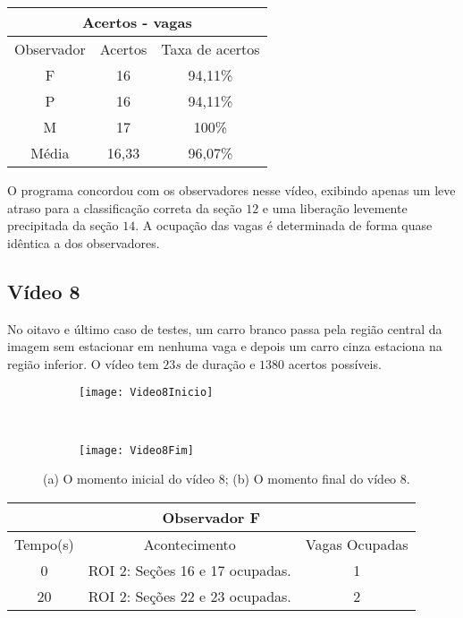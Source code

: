 \begin{center}
\begin{tabular}{|c||c||c|}
\hline
\multicolumn{3}{|c|}{Acertos - vagas}  \\ \hline \hline
Observador & Acertos & Taxa de acertos \\ \hline
F & 16 & 94,11\% \\  \hline
P & 16 & 94,11\% \\ \hline
M & 17 & 100\% \\ \hline
Média & 16,33 & 96,07\% \\
\hline
\end{tabular}
\end{center}

O programa concordou com os observadores nesse vídeo, exibindo apenas um leve atraso para a classificação correta da seção $12$ e uma liberação levemente precipitada da seção $14$. A ocupação das vagas é determinada de forma quase idêntica a dos observadores.

\subsection{Vídeo 8}

No oitavo e último caso de testes, um carro branco passa pela região central da imagem sem estacionar em nenhuma vaga e depois um carro cinza estaciona na região inferior. O vídeo tem $23s$ de duração e $1380$ acertos possíveis.

\begin{figure}[!h]
\centering
\begin{subfigure}{.5\textwidth}
\centering
\texttt{[image: Video8Inicio]}
\caption{}
\end{subfigure}\
\begin{subfigure}{.5\textwidth}
\centering
\texttt{[image: Video8Fim]}
\caption{}
\end{subfigure}
\centering
\caption{(a) O momento inicial do vídeo 8; (b) O momento final do vídeo 8.}%
\label{}%
\end{figure}

\begin{center}
\begin{tabular}{|c||c||c|}
\hline
\multicolumn{3}{|c|}{Observador F}  \\ \hline \hline
Tempo(s) & Acontecimento & Vagas Ocupadas\\ \hline
0 & ROI 2: Seções 16 e 17 ocupadas. & 1 \\ \hline
20 & ROI 2: Seções 22 e 23 ocupadas. & 2 \\
\hline
\end{tabular}
\end{center}

